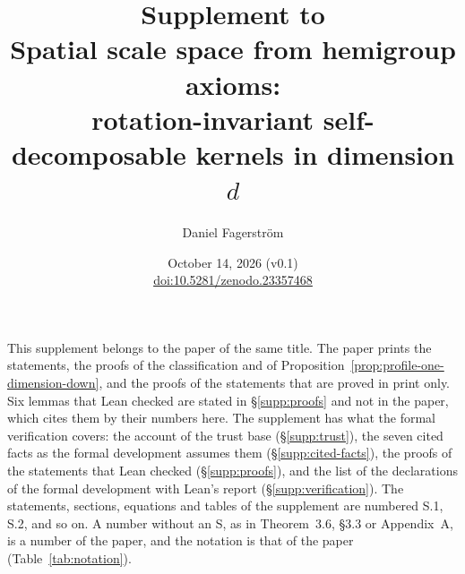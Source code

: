 \documentclass[11pt]{article}
\title{Supplement to\\
Spatial scale space from hemigroup axioms:\\
rotation-invariant self-decomposable kernels in dimension $d$}
\author{Daniel Fagerstr\"om}
\date{October 14, 2026 (v0.1)\\[3pt] {\normalsize \href{https://doi.org/10.5281/zenodo.23357468}{doi:10.5281/zenodo.23357468}}}
\begin{document}
\maketitle

This supplement belongs to the paper of the same title. The paper prints the statements, the
proofs of the classification and of Proposition~\ref{prop:profile-one-dimension-down}, and the
proofs of the statements that are proved in print only.
Six lemmas that Lean checked are stated in \S\ref{supp:proofs} and not in the paper, which
cites them by their numbers here. The supplement has what the formal verification covers: the account of the trust base
(\S\ref{supp:trust}), the seven cited facts as the formal development assumes them
(\S\ref{supp:cited-facts}), the proofs of the statements that Lean checked
(\S\ref{supp:proofs}), and the list of the declarations of the formal development with Lean's
report (\S\ref{supp:verification}). The statements, sections, equations and tables of the
supplement are numbered S.1, S.2, and so on. A number without an S, as in Theorem~3.6, \S3.3 or
Appendix~A, is a number of the paper, and the notation is that of the paper
(Table~\ref{tab:notation}).








\end{document}
